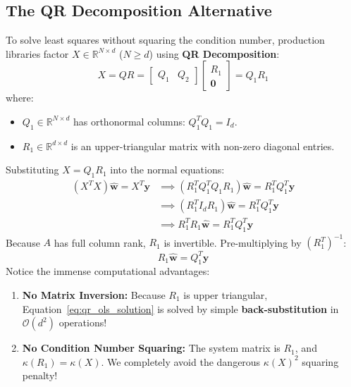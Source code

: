 \subsection{The QR Decomposition Alternative}
To solve least squares without squaring the condition number, production libraries factor $X \in \mathbb{R}^{N \times d}$ ($N \ge d$) using \textbf{QR Decomposition}:
\begin{equation}
X = Q R = \begin{bmatrix} Q_1 & Q_2 \end{bmatrix} \begin{bmatrix} R_1 \\ \mathbf{0} \end{bmatrix} = Q_1 R_1
\end{equation}
where:
\begin{itemize}
    \item $Q_1 \in \mathbb{R}^{N \times d}$ has orthonormal columns: $Q_1^T Q_1 = I_d$.
    \item $R_1 \in \mathbb{R}^{d \times d}$ is an upper-triangular matrix with non-zero diagonal entries.
\end{itemize}

Substituting $X = Q_1 R_1$ into the normal equations:
\begin{align}
(X^T X)\hat{\mathbf{w}} = X^T \mathbf{y} &\implies (R_1^T Q_1^T Q_1 R_1)\hat{\mathbf{w}} = R_1^T Q_1^T \mathbf{y} \\
&\implies (R_1^T I_d R_1)\hat{\mathbf{w}} = R_1^T Q_1^T \mathbf{y} \\
&\implies R_1^T R_1 \hat{\mathbf{w}} = R_1^T Q_1^T \mathbf{y}
\end{align}
Because $A$ has full column rank, $R_1$ is invertible. Pre-multiplying by $(R_1^T)^{-1}$:
\begin{equation}
R_1 \hat{\mathbf{w}} = Q_1^T \mathbf{y}
\label{eq:qr_ols_solution}
\end{equation}
Notice the immense computational advantages:
\begin{enumerate}
    \item \textbf{No Matrix Inversion:} Because $R_1$ is upper triangular, Equation~\eqref{eq:qr_ols_solution} is solved by simple \textbf{back-substitution} in $\mathcal{O}(d^2)$ operations!
    \item \textbf{No Condition Number Squaring:} The system matrix is $R_1$, and $\kappa(R_1) = \kappa(X)$. We completely avoid the dangerous $\kappa(X)^2$ squaring penalty!
\end{enumerate}

